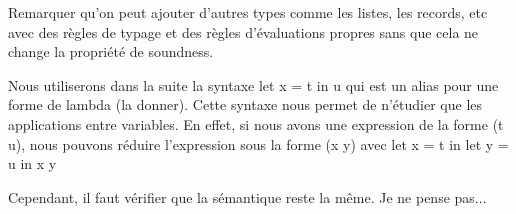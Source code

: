 Remarquer qu'on peut ajouter d'autres types comme les listes, les records,
etc avec des règles de typage et des règles d'évaluations propres sans que
cela ne change la propriété de soundness.

Nous utiliserons dans la suite la syntaxe
let x = t in u qui est un alias pour une forme de lambda (la donner).
Cette syntaxe nous permet de n'étudier que les applications entre variables.
En effet, si nous avons une expression de la forme (t u), nous pouvons réduire
l'expression sous la forme (x y) avec
let x = t in
let y = u in
x y

Cependant, il faut vérifier que la sémantique reste la même. Je ne pense pas...
